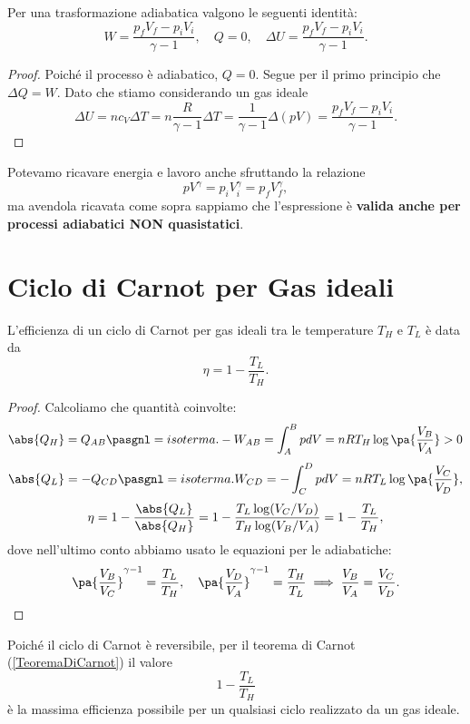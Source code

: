 \begin{proposition}\label{EnergieAdiabatica}
Per una trasformazione adiabatica valgono le seguenti identit\`a:
\[W=\frac{p_fV_f-p_iV_i}{\gamma-1},\quad
Q=0,\quad
\Delta U=\frac{p_fV_f-p_iV_i}{\gamma-1}.\]
\end{proposition}
\begin{proof}
Poich\'e il processo \`e adiabatico, $Q=0$. Segue per il primo principio che $\Delta Q=W$. Dato che stiamo considerando un gas ideale
\[\Delta U=nc_V\Delta T=n\frac R{\gamma-1}\Delta T=\frac 1{\gamma-1}\Delta (pV)=\frac{p_fV_f-p_iV_i}{\gamma-1}.\]
\end{proof}

\begin{remark}
Potevamo ricavare energia e lavoro anche sfruttando la relazione \[pV^\gamma=p_iV_i^\gamma=p_fV_f^\gamma,\] ma avendola ricavata come sopra sappiamo che l'espressione \`e \textbf{valida anche per processi adiabatici NON quasistatici}.
\end{remark}

\section{Ciclo di Carnot per Gas ideali}

\begin{proposition}\label{EfficienzaCicloCarnot}
L'efficienza di un ciclo di Carnot per gas ideali tra le temperature $T_H$ e $T_L$ \`e data da
\[\eta=1-\frac{T_L}{T_H}.\]
\end{proposition}
\begin{proof}
Calcoliamo che quantit\`a coinvolte:
\[\abs{Q_H}=Q_{AB}\pasgnl={isoterma.}-W_{AB}=\int_A^BpdV=nRT_H\log\pa{\frac{V_B}{V_A}}>0\]
\[\abs{Q_L}=-Q_{CD}\pasgnl={isoterma.}W_{CD}=-\int_C^DpdV=nRT_L\log\pa{\frac{V_C}{V_D}},\]
\[\eta=1-\frac{\abs{Q_L}}{\abs{Q_H}}=1-\frac{T_L\log(V_C/V_D)}{T_H\log(V_B/V_A)}=1-\frac{T_L}{T_H},\]
dove nell'ultimo conto abbiamo usato le equazioni per le adiabatiche:
\[\pa{\frac{V_B}{V_C}}^{\gamma-1}=\frac{T_L}{T_H},\quad \pa{\frac{V_D}{V_A}}^{\gamma-1}=\frac{T_H}{T_L}\implies \frac{V_B}{V_A}=\frac{V_C}{V_D}.\]
\end{proof}

\begin{remark}
Poich\'e il ciclo di Carnot \`e reversibile, per il teorema di Carnot (\ref{TeoremaDiCarnot}) il valore
\[1-\frac{T_L}{T_H}\]
\`e la massima efficienza possibile per un qualsiasi ciclo realizzato da un gas ideale.
\end{remark}

